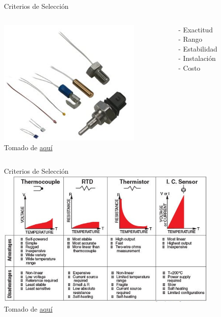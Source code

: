 \documentclass[aspectratio=169]{beamer}
\begin{document}
\begin{frame}{Criterios de Selección}

 \begin{columns}[c, onlytextwidth]
        \begin{column}{0.40\textwidth}
        \centering
            \includegraphics[width=7cm]{fig/Criteria Sensor.PNG}
            \\ \tiny{Tomado de \href{https://www.variohm.com/news-media/technical-blog-archive/selecting-temperature-sensor-things-to-consider}{aquí}}
        \end{column}
        \begin{column}{0.50\textwidth}
               \centering
        {- Exactitud \\
        - Rango \\
        - Estabilidad \\
        - Instalación\\
        - Costo
        }
        \end{column}
    \end{columns}


\end{frame}

\begin{frame}{Criterios de Selección}
    \centering
    \includegraphics[width=11cm]{fig/Selection_Sensor.PNG}
            \\ \tiny{Tomado de \href{https://www.mechaterrain.com/lm35-temperature-sensor}{aquí}}
\end{frame}
\end{document}
